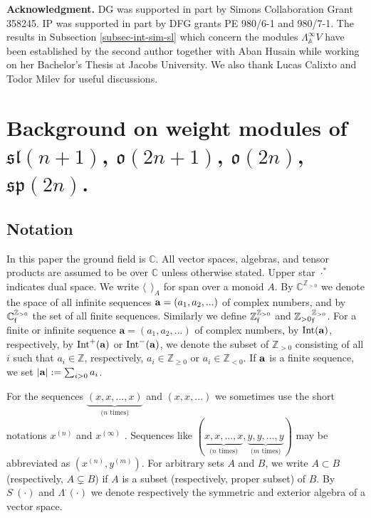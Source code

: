 \documentclass[12pt]{amsart}
\newcommand{\C}{{\mathbb C}}
\newcommand{\Z}{{\mathbb Z}}
\def\Z{\mathbb{Z}}
\begin{document}
{\bf Acknowledgment.} DG was supported in part by Simons Collaboration Grant 358245. IP was supported in part by DFG grants PE 980/6-1 and 980/7-1. The results in Subsection \ref{subsec-int-sim-sl} which concern the modules $\Lambda_{\mathbb A}^{\infty}V$ have been established by the second author together with Aban Husain while working on her Bachelor's Thesis at Jacobs University. We also thank Lucas Calixto and Todor Milev for useful discussions.

\section{Background on weight modules of $\mathfrak{sl}(n+1)$, ${\mathfrak{o}(2n+1)}$, ${\mathfrak{o}(2n)}$, ${\mathfrak{sp}(2n)}$.} \label{sec-background}

\subsection{Notation} \label{subsec-notation}
In this paper the ground field is $\mathbb C$. 
All vector spaces, algebras, and tensor
products are assumed to be over $\mathbb C$ unless otherwise
stated. Upper star  $\cdot^*$  indicates dual space. We write $\langle \:\: \rangle_A$ for span over a monoid $A$. By $\C^{{\mathbb Z}_{>0}}$ we denote the space of all infinite sequences ${\bf a} = (a_1,a_2,...)$ of complex numbers, and by ${\C}^{{\mathbb Z}_{>0}}_{\rm f}$ the set of all finite sequences. Similarly we define $\Z^{{\mathbb Z}_{>0}}_{\rm f}$ and ${{\mathbb Z}_{>0}}^{{\mathbb Z}_{>0}}_{\rm f}$. 
For a finite or infinite sequence ${\mathbf a} = (a_1, a_2,...)$ of complex numbers, by ${\rm Int} ({\bf a})$, respectively, by ${\rm Int}^+  ({\bf a})$ or ${\rm Int}^- ({\bf a})$,  we denote the subset of ${\mathbb Z}_{>0}$ consisting of all $i$ such that $a_i \in {\mathbb Z}$, respectively, $a_i \in {\mathbb Z}_{\geq 0}$ or $a_i \in {\mathbb Z}_{< 0}$.   If  ${\bf a}$ is  a finite sequence, we set $|{\bf a}| := \sum_{i > 0} a_i$. 




For the sequences $\underbrace{(x,x,...,x)}_{\text{($n$ times)}}$ and  $(x,x,...)$ we sometimes use the short notations $x^{(n)}$ and $x^{(\infty)}$ . Sequences like $(\underbrace{x,x,...,x}_{\text{($n$ times)}}, \underbrace{y,y,...,y}_{\text{($m$ times)}})$ may be abbreviated as $(x^{(n)}, y^{(m)})$. For arbitrary sets $A$ and $B$, we write $A \subset B$ (respectively, $A \subsetneq B$) if $A$ is a subset (respectively, proper subset) of $B$.  By $S^\cdot(\cdot)$ and $\Lambda^\cdot(\cdot)$ we denote respectively the symmetric and exterior algebra of a vector space.
\end{document}
